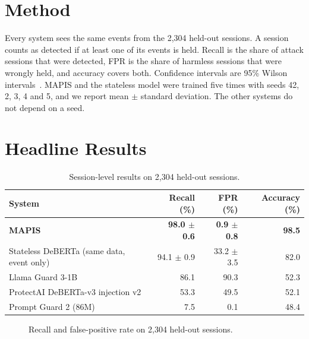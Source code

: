 \label{chap.6}
\section{Method}
Every system sees the same events from the 2,304 held-out sessions. A session counts as detected if at least one of its events is held. Recall is the share of attack sessions that were detected, FPR is the share of harmless sessions that were wrongly held, and accuracy covers both. Confidence intervals are 95\% Wilson intervals~\cite{wilson1927}. MAPIS and the stateless model were trained five times with seeds 42, 2, 3, 4 and 5, and we report mean $\pm$ standard deviation. The other systems do not depend on a seed.

\section{Headline Results}
\begin{table}[H]
\centering\small
\begin{tabular}{lrrr}
\toprule
System & Recall (\%) & FPR (\%) & Accuracy (\%)\\
\midrule
\textbf{MAPIS} & \textbf{98.0 $\pm$ 0.6} & \textbf{0.9 $\pm$ 0.8} & \textbf{98.5}\\
Stateless DeBERTa (same data, event only) & 94.1 $\pm$ 0.9 & 33.2 $\pm$ 3.5 & 82.0\\
Llama Guard 3-1B & 86.1 & 90.3 & 52.3\\
ProtectAI DeBERTa-v3 injection v2 & 53.3 & 49.5 & 52.1\\
Prompt Guard 2 (86M) & 7.5 & 0.1 & 48.4\\
\bottomrule
\end{tabular}
\caption{Session-level results on 2,304 held-out sessions.}
\label{tab:head}
\end{table}

\begin{figure}[H]
\centering
{}
\caption{Recall and false-positive rate on 2,304 held-out sessions.}
\end{figure}

